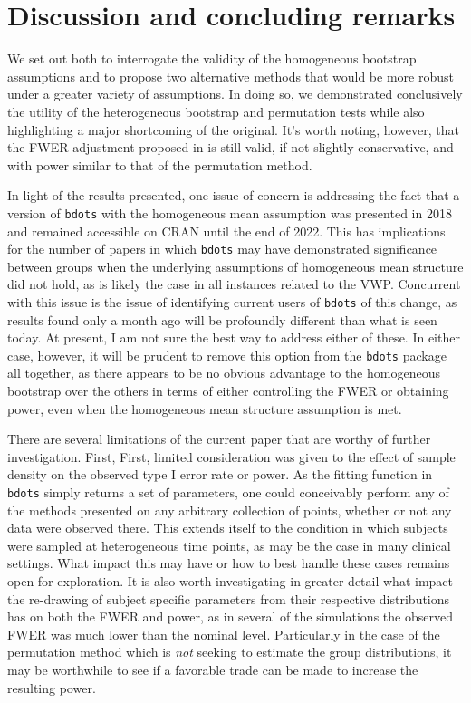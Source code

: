 \documentclass{article}
\newcommand{\xt}{\texttt}
\begin{document}
\section{Discussion and concluding remarks}

We set out both to interrogate the validity of the homogeneous bootstrap assumptions and to propose two alternative methods that would be more robust under a greater variety of assumptions. In doing so, we demonstrated conclusively the utility of the heterogeneous bootstrap and permutation tests while also highlighting a major shortcoming of the original. It's worth noting, however, that the FWER adjustment proposed in \cite{oleson2017detecting} is still valid, if not slightly conservative, and with power similar to that of the permutation method. 

In light of the results presented, one issue of concern is addressing the fact that a version of \xt{bdots} with the homogeneous mean assumption was presented in 2018 and remained accessible on CRAN until the end of 2022. This has implications for the number of papers in which \xt{bdots} may have demonstrated significance between groups when the underlying assumptions of homogeneous mean structure did not hold, as is likely the case in all instances related to the VWP. Concurrent with this issue is the issue of identifying current users of \xt{bdots} of this change, as results found only a month ago will be profoundly different than what is seen today. At present, I am not sure the best way to address either of these. In either case, however, it will be prudent to remove this option from the \xt{bdots} package all together, as there appears to be no obvious advantage to the homogeneous bootstrap over the others in terms of either controlling the FWER or obtaining power, even when the homogeneous mean structure assumption is met.

There are several limitations of the current paper that are worthy of further investigation. First, First, limited consideration was given to the effect of sample density on the observed type I error rate or power. As the fitting function in \xt{bdots} simply returns a set of parameters, one could conceivably perform any of the methods presented on any arbitrary collection of points, whether or not any data were observed there. This extends itself to the condition in which subjects were sampled at heterogeneous time points, as may be the case in many clinical settings. What impact this may have or how to best handle these cases remains open for exploration. It is also worth investigating in greater detail what impact the re-drawing of subject specific parameters from their respective distributions has on both the FWER and power, as in several of the simulations the observed FWER was much lower than the nominal level. Particularly in the case of the permutation method which is \textit{not} seeking to estimate the group distributions, it may be worthwhile to see if a favorable trade can be made to increase the resulting power.
\end{document}

